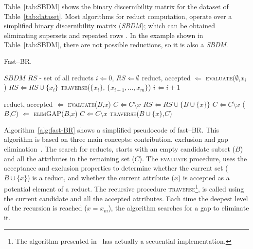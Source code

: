 \documentclass[citenumber]{elsarticle}
\renewcommand{\algorithmicrequire}{\textbf{Input:}}
\renewcommand{\algorithmicensure}{\textbf{Output:}}
\begin{document}
 Table~\ref{tab:SBDM} shows the binary discernibility matrix for the dataset of Table~\ref{tab:dataset}. Most algorithms for reduct computation, operate over a simplified binary discernibility matrix (\textit{SBDM}); which can be obtained eliminating supersets and repeated rows \cite{Yao09}. In the example shown in Table~\ref{tab:SBDM}, there are not possible reductions, so it is also a \textit{SBDM}.
 
 	\renewcommand{\algorithmicrequire}{\textbf{Input:}}
 	\renewcommand{\algorithmicensure}{\textbf{Output:}}
 	\begin{algorithm} \label{alg:fast-BR}
 		\footnotesize
 		\caption{Fast--BR.}
 		\label{alg:RSDM}
 		\begin{multicols}{2}
 			\begin{algorithmic}[1]
 				\Require $SBDM$
 				\Ensure $RS$ - set of all reducts
 				\State $i \Leftarrow 0$, $RS \Leftarrow \emptyset$
 				\State reduct, accepted $\Leftarrow$ \textsc{evaluate}($\emptyset$,$x_i$)
 				\State $RS \Leftarrow RS\cup\lbrace x_i \rbrace$
 				\Else
 				\State \textsc{traverse}($\lbrace x_i \rbrace$, $\lbrace x_{i+1},..., x_m\rbrace$)
 				\EndIf
 				\State $i \Leftarrow i+1$
 				\EndWhile
 				
 				\State reduct, accepted $\Leftarrow$ \textsc{evaluate}($B$,$x$)
 				\State $C \Leftarrow C\setminus x$
 				\State $RS \Leftarrow RS\cup\lbrace B\cup \lbrace x\rbrace \rbrace$
 				\Else
 				\State $C \Leftarrow C\setminus x$
 				\EndIf
 				\EndIf
 				\EndFor
 				\State ($B$,$C$) $\Leftarrow$ \textsc{elimGAP}($B$,$x$)
 				\EndIf
 				\State $C \Leftarrow C\setminus x$
 				\State \textsc{traverse}($B\cup \lbrace x\rbrace$,$C$)
 				\EndFor
 				\EndProcedure
 			\end{algorithmic}
 		\end{multicols}
 	\end{algorithm}    
 
 Algorithm~\ref{alg:fast-BR} shows a simplified pseudocode of fast--BR. This algorithm is based on three main concepts: contribution, exclusion and gap elimination~\cite{Lias13}. The search for reducts, starts with an empty candidate subset ($B$) and all the attributes in the remaining set ($C$). The \textsc{evaluate} procedure, uses the acceptance and exclusion properties to determine whether the current set ($B\cup \lbrace x\rbrace$) is a reduct, and whether the current attribute ($x$) is accepted as a potential element of a reduct. The recursive procedure \textsc{traverse}\footnote{The algorithm presented in~\cite{Lias13} has actually a secuential implementation.}, is called using the current candidate and all the accepted attributes. Each time the deepest level of the recursion is reached ($x=x_m$), the algorithm searches for a gap to eliminate it.
 
\end{document}
